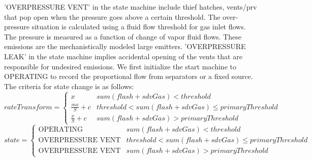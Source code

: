 
'OVERPRESSURE VENT' in the state machine include thief hatches, vents/prv that pop open when the pressure goes above a certain threshold. The over-pressure situation is calculated using a fluid flow threshold for gas inlet flows. The pressure is measured as a function of change of vapor fluid flows. These emissions are the mechanistically modeled large emitters. 'OVERPRESSURE LEAK' in the state machine implies accidental opening of the vents that are responsible for undesired emissions. 
We first initialize the start machine to OPERATING to record the proportional flow from separators or a fixed source. The criteria for state change is as follows:
\begin{equation}
rateTransform=
\begin{cases}
	x& sum(flash+sdvGas)<threshold \\
	\frac{mx}{S}+c& threshold<sum(flash+sdvGas)\leq primaryThreshold\\
	\frac{x}{S}+c& sum(flash+sdvGas)>primaryThreshold
\end{cases}
\end{equation}
\begin{equation}
	state=
	\begin{cases}
		\text{OPERATING}& sum(flash+sdvGas)<threshold \\
		\text{OVERPRESSURE VENT}& threshold<sum(flash+sdvGas)\leq primaryThreshold\\
		\text{OVERPRESSURE VENT}& sum(flash+sdvGas)>primaryThreshold
	\end{cases}
\end{equation}

